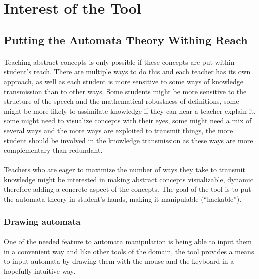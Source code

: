 \documentclass{article}
\begin{document}
\tableofcontents
\begin{sloppypar}

\section{ Interest of the Tool}

\subsection{ Putting the Automata Theory Withing Reach}


\paragraph{}
Teaching abstract concepts is only possible if these concepts are put within student's reach. There are multiple ways to do this and each teacher has its own approach, as well as each student is more sensitive to some ways of knowledge transmission than to other ways. Some students might be more sensitive to the structure of the speech and the mathematical robustness of definitions, some might be more likely to assimilate knowledge if they can hear a teacher explain it, some might need to visualize concepts with their eyes, some might need a mix of several ways and the more ways are exploited to transmit things, the more student should be involved in the knowledge transmission as these ways are more complementary than redundant.


\paragraph{}
Teachers who are eager to maximize the number of ways they take to transmit knowledge might be interested in making abstract concepts visualizable, dynamic therefore adding a concrete aspect of the concepts. The goal of the tool is to put the automata theory in student's hands, making it manipulable (``hackable'').


\subsubsection{ Drawing automata}


\paragraph{}
One of the needed feature to automata manipulation is being able to input them in a convenient way and like other tools of the domain, the tool provides a means to input automata by drawing them with the mouse and the keyboard in a hopefully intuitive way.



\end{sloppypar}
\end{document}
